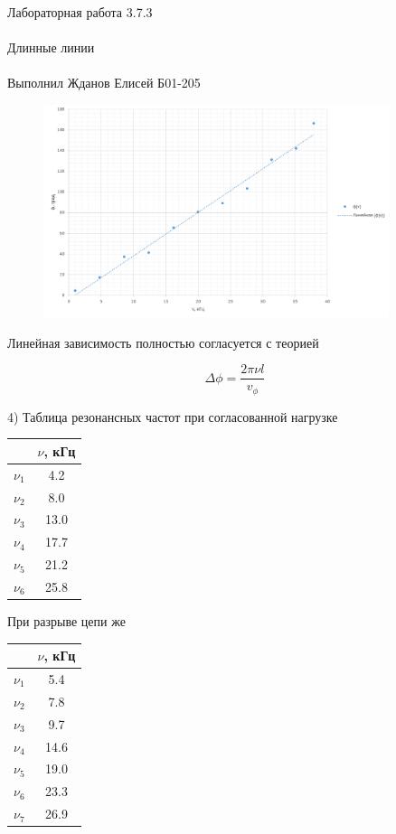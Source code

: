 \documentclass{astroedu-lab}
\begin{document}
\begin{problem}{\huge Лабораторная работа 3.7.3\\\\Длинные линии\\\\Выполнил Жданов Елисей Б01-205}
\begin{figure}[!h]
	\centering
	\includegraphics[width=0.9\textwidth]{граф4.png}
	\label{fig:boiler}
\end{figure}

Линейная зависимость полностью согласуется с теорией

\begin{equation}
	\Delta \phi = \frac{2 \pi \nu l}{v_\phi}
\end{equation}

4) Таблица резонансных частот при согласованной нагрузке

\begin{center}
\begin{tabular}{|c|c|}
\hline 
& $\nu$, кГц \\
\hline
$\nu_1$ & 4.2 \\
$\nu_2$ & 8.0 \\
$\nu_3$ & 13.0 \\
$\nu_4$ & 17.7 \\
$\nu_5$ & 21.2 \\
$\nu_6$ & 25.8 \\
\hline
\end{tabular}
\end{center}

При разрыве цепи же

\begin{center}
\begin{tabular}{|c|c|}
\hline 
& $\nu$, кГц \\
\hline
$\nu_1$ & 5.4 \\
$\nu_2$ & 7.8 \\
$\nu_3$ & 9.7 \\
$\nu_4$ & 14.6 \\
$\nu_5$ & 19.0 \\
$\nu_6$ & 23.3 \\
$\nu_7$ & 26.9 \\
\hline
\end{tabular}
\end{center}


\end{problem}
\end{document}
